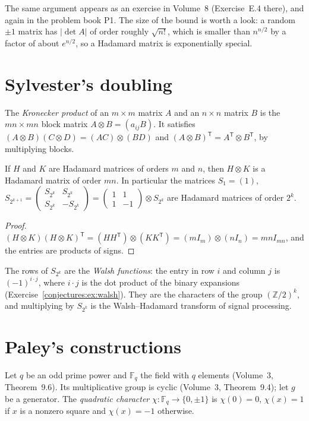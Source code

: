 The same argument appears as an exercise in Volume~8 (Exercise~E.4 there), and again in the problem book P1. The
size of the bound is worth a look: a random $\pm1$ matrix has $|\det A|$ of order roughly $\sqrt{n!}$, which is smaller than $n^{n/2}$ by a factor
of about $e^{n/2}$, so a Hadamard matrix is exponentially special.

\section{Sylvester's doubling}

The \emph{Kronecker product} of an $m\times m$ matrix $A$ and an $n\times n$ matrix $B$ is the $mn\times mn$ block matrix $A\otimes B=(a_{ij}B)$. It
satisfies $(A\otimes B)(C\otimes D)=(AC)\otimes(BD)$ and $(A\otimes B)^{\mathsf T}=A^{\mathsf T}\otimes B^{\mathsf T}$, by multiplying blocks.

\begin{proposition}[Sylvester, 1867]\label{conjectures:prop:kron}
If $H$ and $K$ are Hadamard matrices of orders $m$ and $n$, then $H\otimes K$ is a Hadamard matrix of order $mn$. In particular the matrices
$S_1=(1)$, $S_{2^{k+1}}=\begin{pmatrix}S_{2^k}&S_{2^k}\\S_{2^k}&-S_{2^k}\end{pmatrix}=\begin{pmatrix}1&1\\1&-1\end{pmatrix}\otimes S_{2^k}$ are
Hadamard matrices of order $2^k$.
\end{proposition}
\begin{proof}
$(H\otimes K)(H\otimes K)^{\mathsf T}=(HH^{\mathsf T})\otimes(KK^{\mathsf T})=(mI_m)\otimes(nI_n)=mnI_{mn}$, and the entries are products of signs.
\end{proof}

The rows of $S_{2^k}$ are the \emph{Walsh functions}: the entry in row $i$ and column $j$ is $(-1)^{i\cdot j}$, where $i\cdot j$ is the dot product of
the binary expansions (Exercise~\ref{conjectures:ex:walsh}). They are the characters of the group $(\mathbb Z/2)^k$, and multiplying by $S_{2^k}$ is the
Walsh--Hadamard transform of signal processing.

\section{Paley's constructions}

Let $q$ be an odd prime power and $\mathbb F_q$ the field with $q$ elements (Volume~3, Theorem~9.6). Its multiplicative group is cyclic (Volume~3,
Theorem~9.4); let $g$ be a generator. The \emph{quadratic character} $\chi:\mathbb F_q\to\{0,\pm1\}$ is $\chi(0)=0$, $\chi(x)=1$ if $x$ is a nonzero
square and $\chi(x)=-1$ otherwise.


